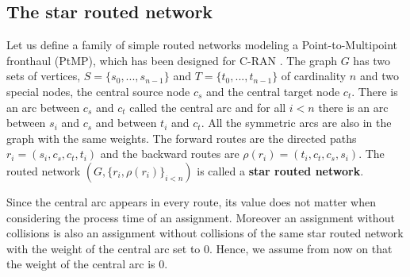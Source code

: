 \documentclass[10pt, conference, letterpaper]{IEEEtran}
\begin{document}
 
 
    \subsection{The star routed network}
    
      Let us define a family of simple routed networks modeling a Point-to-Multipoint fronthaul (PtMP), which has been designed for C-RAN \cite{tayq2017real}. 
      The graph $G$ has two sets of vertices, $S=\{s_0,...,s_{n-1}\}$ and $T=\{t_0,...,t_{n-1}\}$ of cardinality $n$ and two special nodes, the central source node $c_s$ and the central target node $c_t$.
      There is an arc between $c_s$ and  $c_t$ called the central arc and for all $i<n$ there is an arc between $s_i$ and $c_s$ and between $t_i$ and $c_t$. All the symmetric arcs are also in the graph with the same weights.
      The forward routes are the directed paths $r_i = (s_i,c_s,c_t,t_i)$ and the backward routes are $\rho(r_i) =(t_i,c_t,c_s,s_i)$. The routed network $(G, \{r_i,\rho(r_i)\}_{i<n})$ is called a \textbf{star routed network}. 
       
       \begin{center}

  \end{center}
  
  Since the central arc appears in every route, its value does not matter when considering the process time of an assignment.
  Moreover an assignment without collisions is also an assignment without collisions of the same star routed network with the weight of the central arc set to $0$. Hence, we assume from now on that the weight of the central arc is $0$.
      
\end{document}
